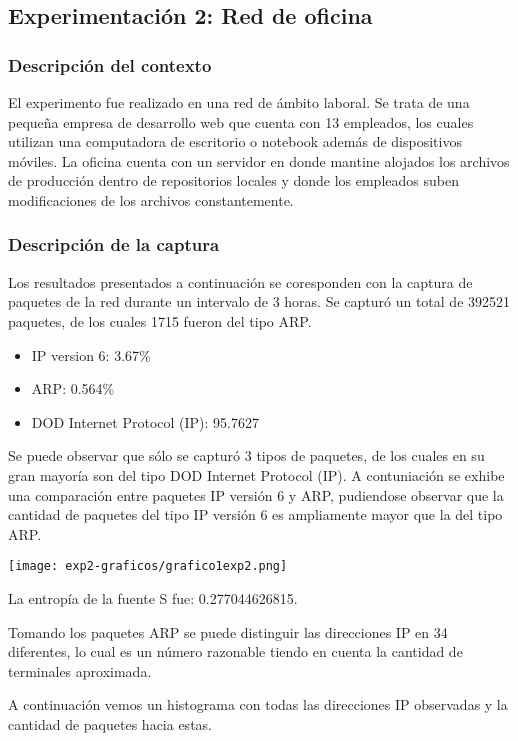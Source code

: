 
\subsection{Experimentaci\'on 2: Red de oficina}

\subsubsection{Descripci\'on del contexto}
El experimento fue realizado en una red de ámbito laboral. Se trata de una pequeña empresa de desarrollo web que cuenta con 13 empleados, los cuales utilizan una computadora de escritorio o notebook además de dispositivos móviles. La oficina cuenta con un servidor en donde mantine alojados los archivos de producción dentro de repositorios locales y donde los empleados suben modificaciones de los archivos constantemente.

\subsubsection{Descripci\'on de la captura}
Los resultados presentados a continuación se coresponden con la captura de paquetes de la red durante un intervalo de 3 horas.
Se capturó un total de 392521 paquetes, de los cuales 1715 fueron del tipo ARP.
\begin{itemize}
\item IP version 6: 3.67\%
\item ARP: 0.564\%
\item DOD Internet Protocol (IP): 95.7627%
\end{itemize}
Se puede observar que sólo se capturó 3 tipos de paquetes, de los cuales en su gran mayoría son del tipo DOD Internet Protocol (IP).
A contuniación se exhibe una comparación entre paquetes IP versión 6 y ARP, pudiendose observar que la cantidad de paquetes del tipo IP versión 6 es ampliamente mayor que la del tipo ARP.
\begin{center}
\texttt{[image: exp2-graficos/grafico1exp2.png]}
\end{center}

La entrop\'ia de la fuente S fue: 0.277044626815.\newline

Tomando los paquetes ARP se puede distinguir las direcciones IP en 34 diferentes, lo cual es un número razonable tiendo en cuenta la cantidad de terminales aproximada.

A continuación vemos un histograma con todas las direcciones IP observadas y la cantidad de paquetes hacia estas.


